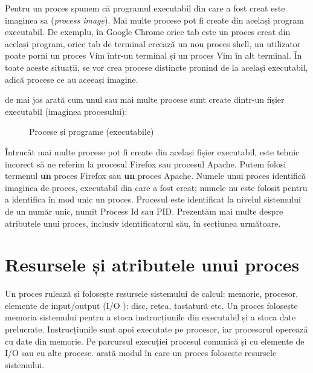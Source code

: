Pentru un proces spunem că programul executabil din care a fost creat este
imaginea sa (\textit{process image}). Mai multe procese pot fi create din
același program executabil. De exemplu, în Google Chrome orice tab este un
proces creat din același program, orice tab de terminal creează un nou proces
shell, un utilizator poate porni un proces Vim într-un terminal și un proces Vim
în alt terminal. În toate aceste situații, se vor crea procese distincte pronind
de la același executabil, adică procese ce au aceeași imagine.

 de mai jos arată cum unul sau mai multe procese sunt create dintr-un
fișier executabil (imaginea procesului):

\begin{figure}[!htbp]
	\centering
	\def\svgwidth{0.8\textwidth}
	
	\caption{Procese și programe (executabile)}
	\label{fig:process-process-exec}
\end{figure}

Întrucât mai multe procese pot fi create din același fișier executabil, este
tehnic incorect să ne referim la procesul Firefox sau procesul Apache. Putem
folosi termenul \textbf{un} proces Firefox sau \textbf{un} proces Apache. Numele
unui proces identifică imaginea de proces, executabil din care a fost creat;
numele nu este folosit pentru a identifica în mod unic un proces. Procesul este
identificat la nivelul sistemului de un număr unic, numit Process Id sau PID. Prezentăm mai multe despre atributele unui proces,
inclusiv identificatorul său, în secțiunea următoare.

\section{Resursele și atributele unui proces}
\label{sec:process-resurse}

Un proces rulează și folosește resursele sistemului de calcul: memorie,
procesor, elemente de input/output (I/O ): disc,
rețea, tastatură etc. Un proces folosește memoria sistemului pentru a stoca
instrucțiunile din executabil și a stoca date prelucrate. Instrucțiunile sunt
apoi executate pe procesor, iar procesorul operează cu date din memorie. Pe
parcursul execuției procesul comunică și cu elemente de I/O sau cu alte procese.
 arată modul în care un proces folosește resursele
sistemului.

